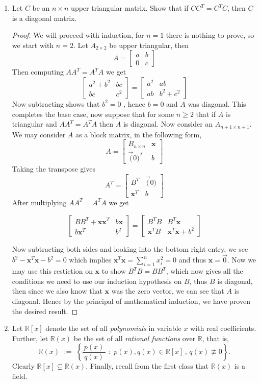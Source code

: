 \documentclass[11pt,table]{article}
\newcommand {\mat}  [1] {\left[\begin{array}{#1}}
\newcommand {\rix}      {\end{array}\right]}
\newcommand{\<}				{\langle}
\renewcommand{\>}      		{\rangle}
\newcommand{\bR}{\mathbb{R}}
\def\bfx{\mathbf{x}}
\begin{document}
\begin{enumerate}
\begin{enumerate}
\end{enumerate}

\bigskip
\item 
Let $C$ be an $n \times n$ upper triangular matrix. 
Show that if $CC^T = C^T C$, then $C$ is a diagonal matrix. 

\begin{proof}
	We will proceed with induction, for $n =1$ there is nothing to prove, so we start with $n = 2$. Let $A_{2 \times 2}$ be upper triangular, 
	then 
	\[A = \mat{rr} a & b \\ 0 & c \rix\]
	Then computing $AA^T = A^TA$ we get 
	\[\mat{rr} a^2 + b^2 & bc \\ bc & c^2 \rix = \mat{rr} a^2 & ab \\ ab & b^2 + c^2 \rix \]
	Now subtracting shows that $b^2 = 0$ , hence $b = 0$ and $A$ was diagonal. This completes the base case, now suppose 
	that for some $n \geq 2$ that if $A$ is triangular and $AA^T = A^TA$ then $A$ is diagonal. Now consider an $A_{n + 1 \times n+ 1}$. 
	We may consider $A$ as a block matrix, in the following form,
	\[A = \mat{rr} B_{n \times n} & \bfx \\ \vec(0)^T & b \rix \]
	Taking the transpose gives 
	\[A^T = \mat{rr} B^T & \vec(0) \\ \bfx^T & b \rix\]
	After multiplying $AA^T = A^TA$ we get 

	\[\mat{rr} BB^T + \bfx \bfx^T & b \bfx \\ b \bfx^T & b^2 \rix = \mat{rr} B^TB  & B^T \bfx \\ \bfx^T B & \bfx^T \bfx + b^2 \rix \]


	Now subtracting both sides and looking into the bottom right entry, we see $b^2 - \bfx^T \bfx - b^2 = 0$ which implies $\bfx^T \bfx = \sum_{i= 1}^n x_i^2 = 0$ and thus $\bfx = \vec{0}$. 
	Now we may use this restiction on $\bfx$ to show $B^TB = BB^T$, which now gives all the conditions we need to use our induction hypothesis on $B$, thus $B$ is diagonal, then since we also know that 
	$\bfx$ was the zero vector, we can see that $A$ is diagonal. Hence by the principal of mathematical induction, we have proven the desired result. 
\end{proof}

\bigskip


\item 
Let $\mathbb{R}[x]$ denote the set of all {\em polynomials} in 
variable $x$ with real coefficients. 
Further, let $\mathbb{R}(x)$ be the set of all 
{\em rational functions} over $\mathbb{R}$, that is, 
\begin{equation} \label{eq:field-of-rational-functions}
\mathbb{R}(x) 
\,\, := \,\, 
\left\{ 
	\dfrac{\, p(x) \,}{\, q(x) \,} 
	\,\, : \,\, 
	p(x), q(x) \in \mathbb{R}[x] \, , \, q(x) \not \equiv 0
\right\}.
\end{equation}
Clearly $\bR[x] \subsetneq \bR(x)$. Finally, recall from the first class that $\bR(x)$ is a field. 


\end{enumerate}
\end{document}
